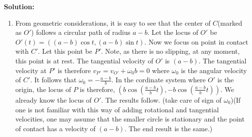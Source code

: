 \documentclass[oneside]{book}\twocolumn
\begin{document}
\textbf{Solution:}
\begin{enumerate}
    \item From geometric considerations, it is easy to see that the center of $C$(marked as $O'$) follows a circular path of radius $a-b$. Let the locus of $O'$ be $O'(t)=((a-b)\cos t,(a-b)\sin t)$. Now we focus on point in contact with $C'$. Let this point be $P'$. Note, as there is no slipping, at any moment, this point is at rest. The tangential velocity of $O'$ is $(a-b)$. The tangential velocity at $P'$ is therefore $v_{P'}=v_{O'}+\omega_0b=0$ where $\omega_0$ is the angular velocity of $C'$. It follows that $\omega_0=-\frac{a-b}{b}$. In the cordinate system where $O'$ is the origin, the locus of $P$ is therefore, $(b\cos\left(\frac{a-b}{b}t\right),-b\cos\left(\frac{a-b}{b}t\right))$. We already know the locus of $O'$. The results follow. (take care of sign of $\omega_0$)(If one is not familiar with this way of adding rotational and tangential velocities, one may assume that the smaller circle is stationary and the point of contact has a velocity of $(a-b)$. The end result is the same.)  
    \begin{center}

\begin{tikzpicture}[x=0.75pt,y=0.75pt,yscale=-1,xscale=1]


\end{tikzpicture}
\end{center}
\end{enumerate}
\end{document}
